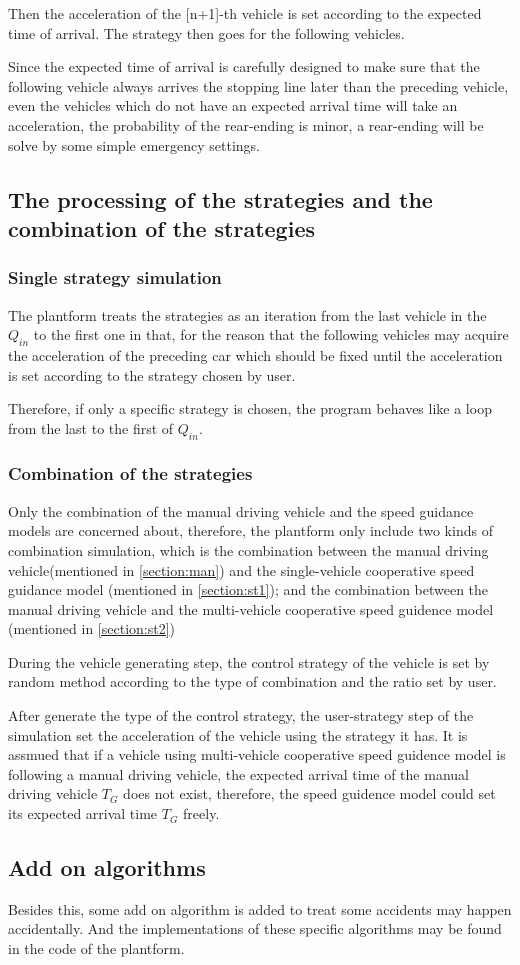 \documentclass[a4paper,UTF8]{paper}
\begin{document}
Then the acceleration of the [n+1]-th vehicle is set according to the expected time of arrival. The strategy then goes for the following vehicles.

Since the expected time of arrival is carefully designed to make sure that the following vehicle always arrives the stopping line later than the preceding vehicle, even the vehicles which do not have an expected arrival time will take an acceleration, the probability of the rear-ending is minor, a rear-ending will be solve by some simple emergency settings. 
\subsection{The processing of the strategies and the combination of the strategies}
\subsubsection{Single strategy simulation}
The plantform treats the strategies as an iteration from the last vehicle in the $Q_{in}$ to the first one in that, for the reason that the following vehicles may acquire the acceleration of the preceding car which should be fixed until the acceleration is set according to the strategy chosen by user. 

Therefore, if only a specific strategy is chosen, the program behaves like a loop from the last to the first of $Q_{in}$.

\subsubsection{Combination of the strategies}
Only the combination of the manual driving vehicle and the speed guidance models are concerned about, therefore, the plantform only include two kinds of combination simulation, which is the combination between the manual driving vehicle(mentioned in \ref{section:man}) and the single-vehicle cooperative speed guidance model (mentioned in \ref{section:st1}); and the combination between the manual driving vehicle and the multi-vehicle cooperative speed guidence model (mentioned in \ref{section:st2})

During the vehicle generating step, the control strategy of the vehicle is set by random method according to the type of combination and the ratio set by user.

After generate the type of the control strategy, the user-strategy step of the simulation set the acceleration of the vehicle using the strategy it has. It is assmued that if a vehicle using multi-vehicle cooperative speed guidence model is following a manual driving vehicle, the expected arrival time of the manual driving vehicle $T_G$ does not exist, therefore, the speed guidence model could set its expected arrival time $T_G$ freely.

\subsection{Add on algorithms}
Besides this, some add on algorithm is added to treat some accidents may happen accidentally. And the implementations of these specific algorithms may be found in the code of the plantform.
\end{document}
